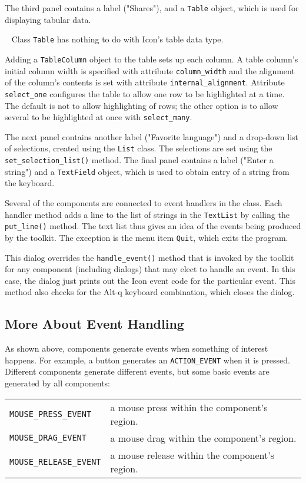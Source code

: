 The third panel contains a label ("Shares"),
and a \texttt{Table} object, which is used for displaying tabular data.

\medskip{}\ {\sffamily
Class \texttt{Table} has nothing to do with Icon's table data type.}\medskip

Adding a \texttt{TableColumn} object to the table sets up each column. A table column's
initial column width is specified with attribute \texttt{column\_width}
and the alignment of the column's contents is set with
attribute \texttt{internal\_alignment}. Attribute
\texttt{select\_one} configures the table to allow one row to
be highlighted at a time. The default is not to allow highlighting of
rows; the other option is to allow several to be highlighted at once
with \texttt{select\_many}.

The next panel contains another label ("Favorite
language") and a drop-down list of selections, created
using the \texttt{List} class. The selections are set using the
\texttt{set\_selection\_list()} method. The final panel contains a
label ("Enter a string") and a
\texttt{TextField} object, which is used to obtain entry of a string
from the keyboard.

Several of the components are connected to event handlers in the class.
Each handler method adds a line to the list of strings in the
\texttt{TextList} by calling the \texttt{put\_line()} method. The text
list thus gives an idea of the events being produced by the toolkit.
The exception is the menu item \texttt{Quit}, which exits the
program.

This dialog overrides the \texttt{handle\_event()} method that is
invoked by the toolkit for any component (including dialogs)
that may elect to handle an event. In this case, the dialog just
prints out the Icon event code for the particular event. This method
also checks for the Alt-q keyboard combination, which closes the
dialog.

\subsection*{More About Event Handling}

As shown above, components generate events when
something of interest happens. For example, a button generates an
\texttt{ACTION\_EVENT} when it is pressed. Different components
generate different events, but some basic events are generated by
all components:

\vspace{0.15in}
\begin{xtabular}{m{2.2in} m{3.5in}}
\texttt{MOUSE\_PRESS\_EVENT} &
 a mouse press within the component's
region.\\
\texttt{MOUSE\_DRAG\_EVENT} &
 a mouse drag within the component's
region.\\
\texttt{MOUSE\_RELEASE\_EVENT} &
 a mouse release within the component's
region.\\
\end{xtabular}
\vspace{0.15in}

